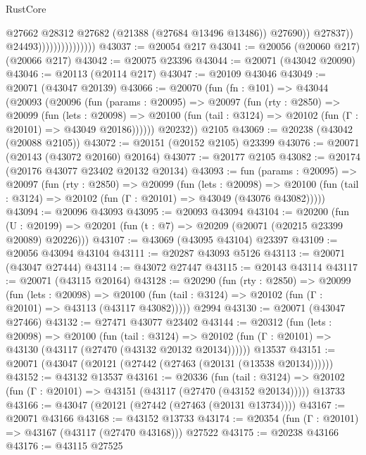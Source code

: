 \begin{lexlean}{RustCore}
\begin{coremodule}
                                          @27662
                                          @28312
                                          @27682
                                          (@21388 (@27684 @13496 @13486))
                                          @27690))
                                      @27837))
                                  @24493)))))))))))))))
@43037 := @20054 @217
@43041 := @20056 (@20060 @217) (@20066 @217)
@43042 := @20075 @23396
@43044 := @20071 (@43042 @20090)
@43046 := @20113 (@20114 @217)
@43047 := @20109 @43046
@43049 := @20071 (@43047 @20139)
@43066 := @20070
    (fun (fn : @101) =>
    @43044
      (@20093
        (@20096
          (fun (params : @20095) =>
          @20097
            (fun (rty : @2850) =>
            @20099
              (fun (lets : @20098) =>
              @20100 (fun (tail : @3124) => @20102 (fun (Γ : @20101) => @43049 @20186))))))
        @20232))
    @2105
@43069 := @20238 (@43042 (@20088 @2105))
@43072 := @20151 (@20152 @2105) @23399
@43076 := @20071 (@20143 (@43072 @20160) @20164)
@43077 := @20177 @2105
@43082 := @20174 (@20176 @43077 @23402 @20132 @20134)
@43093 := fun (params : @20095) =>
  @20097
    (fun (rty : @2850) =>
    @20099
      (fun (lets : @20098) =>
      @20100 (fun (tail : @3124) => @20102 (fun (Γ : @20101) => @43049 (@43076 @43082)))))
@43094 := @20096 @43093
@43095 := @20093 @43094
@43104 := @20200
    (fun (U : @20199) => @20201 (fun (t : @7) => @20209 (@20071 (@20215 @23399 @20089) @20226)))
@43107 := @43069 (@43095 @43104) @23397
@43109 := @20056 @43094 @43104
@43111 := @20287 @43093 @5126
@43113 := @20071 (@43047 @27444)
@43114 := @43072 @27447
@43115 := @20143 @43114
@43117 := @20071 (@43115 @20164)
@43128 := @20290
    (fun (rty : @2850) =>
    @20099
      (fun (lets : @20098) =>
      @20100 (fun (tail : @3124) => @20102 (fun (Γ : @20101) => @43113 (@43117 @43082)))))
    @2994
@43130 := @20071 (@43047 @27466)
@43132 := @27471 @43077 @23402
@43144 := @20312
    (fun (lets : @20098) =>
    @20100
      (fun (tail : @3124) =>
      @20102 (fun (Γ : @20101) => @43130 (@43117 (@27470 (@43132 @20132 @20134))))))
    @13537
@43151 := @20071 (@43047 (@20121 (@27442 (@27463 (@20131 (@13538 @20134))))))
@43152 := @43132 @13537
@43161 := @20336
    (fun (tail : @3124) => @20102 (fun (Γ : @20101) => @43151 (@43117 (@27470 (@43152 @20134)))))
    @13733
@43166 := @43047 (@20121 (@27442 (@27463 (@20131 @13734))))
@43167 := @20071 @43166
@43168 := @43152 @13733
@43174 := @20354 (fun (Γ : @20101) => @43167 (@43117 (@27470 @43168))) @27522
@43175 := @20238 @43166
@43176 := @43115 @27525

\end{coremodule}
\end{lexlean}
